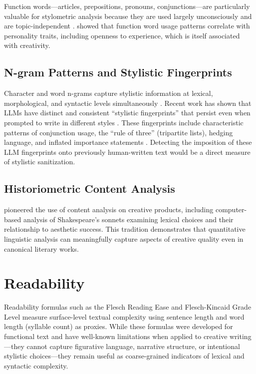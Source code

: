 \documentclass[12pt,a4paper]{article}
\begin{document}
Function words---articles, prepositions, pronouns, conjunctions---are particularly valuable for stylometric analysis because they are used largely unconsciously and are topic-independent \citep{stamatatos2009survey, pennebaker2011secret}. \citet{pennebaker1999linguistic} showed that function word usage patterns correlate with personality traits, including openness to experience, which is itself associated with creativity.

\subsection{N-gram Patterns and Stylistic Fingerprints}

Character and word n-grams capture stylistic information at lexical, morphological, and syntactic levels simultaneously \citep{ngram_style2022, lagutina2019stylometric}. Recent work has shown that LLMs have distinct and consistent ``stylistic fingerprints'' that persist even when prompted to write in different styles \citep{stylistic_fingerprints2025}. These fingerprints include characteristic patterns of conjunction usage, the ``rule of three'' (tripartite lists), hedging language, and inflated importance statements \citep{tang2024survey}. Detecting the imposition of these LLM fingerprints onto previously human-written text would be a direct measure of stylistic sanitization.

\subsection{Historiometric Content Analysis}

\citet{simonton1984genius, simonton1990shakespeare} pioneered the use of content analysis on creative products, including computer-based analysis of Shakespeare's sonnets examining lexical choices and their relationship to aesthetic success. This tradition demonstrates that quantitative linguistic analysis can meaningfully capture aspects of creative quality even in canonical literary works.

\section{Readability}

Readability formulas such as the Flesch Reading Ease and Flesch-Kincaid Grade Level \citep{flesch1948new, kincaid1975derivation} measure surface-level textual complexity using sentence length and word length (syllable count) as proxies. While these formulas were developed for functional text and have well-known limitations when applied to creative writing---they cannot capture figurative language, narrative structure, or intentional stylistic choices---they remain useful as coarse-grained indicators of lexical and syntactic complexity.
\end{document}
